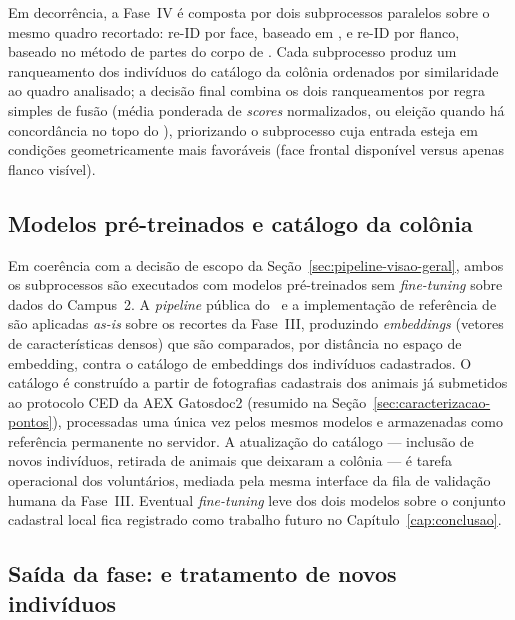 Em decorrência, a Fase~IV é composta por dois subprocessos paralelos sobre o mesmo quadro recortado: re-ID por face, baseado em \modeloPetFace, e re-ID por flanco, baseado no método de partes do corpo de . Cada subprocesso produz um ranqueamento dos indivíduos do catálogo da colônia ordenados por similaridade ao quadro analisado; a decisão final combina os dois ranqueamentos por regra simples de fusão (média ponderada de \emph{scores} normalizados, ou eleição quando há concordância no topo do ), priorizando o subprocesso cuja entrada esteja em condições geometricamente mais favoráveis (face frontal disponível versus apenas flanco visível).

\subsection*{Modelos pré-treinados e catálogo da colônia}

Em coerência com a decisão de escopo da Seção~\ref{sec:pipeline-visao-geral}, ambos os subprocessos são executados com modelos pré-treinados sem \emph{fine-tuning} sobre dados do Campus~2. A \emph{pipeline} pública do \modeloPetFace~e a implementação de referência de  são aplicadas \emph{as-is} sobre os recortes da Fase~III, produzindo \emph{embeddings} (vetores de características densos) que são comparados, por distância no espaço de embedding, contra o catálogo de embeddings dos indivíduos cadastrados. O catálogo é construído a partir de fotografias cadastrais dos animais já submetidos ao protocolo CED da AEX Gatosdoc2 (resumido na Seção~\ref{sec:caracterizacao-pontos}), processadas uma única vez pelos mesmos modelos e armazenadas como referência permanente no servidor. A atualização do catálogo --- inclusão de novos indivíduos, retirada de animais que deixaram a colônia --- é tarefa operacional dos voluntários, mediada pela mesma interface da fila de validação humana da Fase~III. Eventual \emph{fine-tuning} leve dos dois modelos sobre o conjunto cadastral local fica registrado como trabalho futuro no Capítulo~\ref{cap:conclusao}.

\subsection*{Saída da fase: \RankK{} e tratamento de novos indivíduos}

